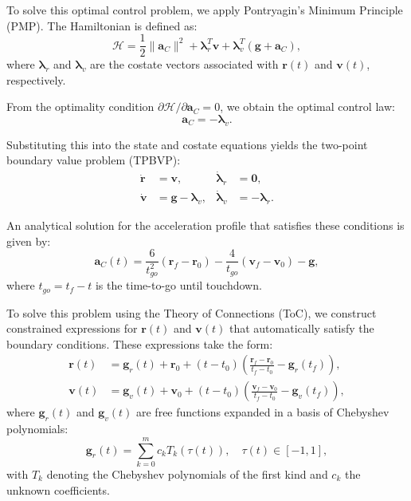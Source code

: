 To solve this optimal control problem, we apply Pontryagin’s Minimum Principle (PMP). The Hamiltonian is defined as:
\begin{equation}
    \mathcal{H} = \frac{1}{2} \|\mathbf{a}_C\|^2 + \boldsymbol{\lambda}_r^T \mathbf{v} + \boldsymbol{\lambda}_v^T (\mathbf{g} + \mathbf{a}_C),
\end{equation}
where $\boldsymbol{\lambda}_r$ and $\boldsymbol{\lambda}_v$ are the costate vectors associated with $\mathbf{r}(t)$ and $\mathbf{v}(t)$, respectively.

From the optimality condition $\partial \mathcal{H}/\partial \mathbf{a}_C = 0$, we obtain the optimal control law:
\begin{equation}
    \mathbf{a}_C = -\boldsymbol{\lambda}_v.
\end{equation}

Substituting this into the state and costate equations yields the two-point boundary value problem (TPBVP):
\begin{align}
    \dot{\mathbf{r}} &= \mathbf{v}, & \dot{\boldsymbol{\lambda}}_r &= \mathbf{0}, \\
    \dot{\mathbf{v}} &= \mathbf{g} - \boldsymbol{\lambda}_v, & \dot{\boldsymbol{\lambda}}_v &= -\boldsymbol{\lambda}_r.
\end{align}

An analytical solution for the acceleration profile that satisfies these conditions is given by:
\begin{equation}
    \mathbf{a}_C(t) = \frac{6}{t_{go}^2} (\mathbf{r}_f - \mathbf{r}_0) - \frac{4}{t_{go}} (\mathbf{v}_f - \mathbf{v}_0) - \mathbf{g},
\end{equation}
where $t_{go} = t_f - t$ is the time-to-go until touchdown.

To solve this problem using the Theory of Connections (ToC), we construct constrained expressions for $\mathbf{r}(t)$ and $\mathbf{v}(t)$ that automatically satisfy the boundary conditions. These expressions take the form:
\begin{align}
    \mathbf{r}(t) &= \mathbf{g}_r(t) + \mathbf{r}_0 + (t - t_0) \left( \frac{\mathbf{r}_f - \mathbf{r}_0}{t_f - t_0} - \mathbf{g}_r(t_f) \right), \\
    \mathbf{v}(t) &= \mathbf{g}_v(t) + \mathbf{v}_0 + (t - t_0) \left( \frac{\mathbf{v}_f - \mathbf{v}_0}{t_f - t_0} - \mathbf{g}_v(t_f) \right),
\end{align}
where $\mathbf{g}_r(t)$ and $\mathbf{g}_v(t)$ are free functions expanded in a basis of Chebyshev polynomials:
\begin{equation}
    \mathbf{g}_r(t) = \sum_{k=0}^{m} c_k T_k(\tau(t)), \quad \tau(t) \in [-1, 1],
\end{equation}
with $T_k$ denoting the Chebyshev polynomials of the first kind and $c_k$ the unknown coefficients.

